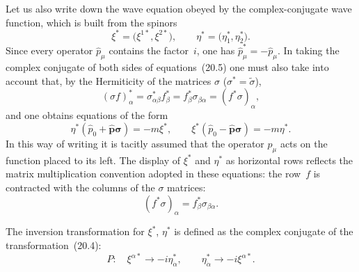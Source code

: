 Let us also write down the wave equation obeyed by the complex-conjugate wave function, which is built from the spinors
\begin{equation}
\xi^* = \bigl(\xi^{1*}, \xi^{2*}\bigr),\qquad \eta^* = \bigl(\eta^*_{\dot 1}, \eta^*_{\dot 2}\bigr).
\tag{20.10}
\end{equation}
Since every operator $\widehat p_\mu$ contains the factor~$i$, one has $\widehat p^*_\mu = -\widehat p_\mu$. In taking the complex conjugate of both sides of equations~(20.5) one must also take into account that, by the Hermiticity of the matrices $\sigma$ ($\sigma^* = \widetilde\sigma$),
\[
(\sigma f)^*_\alpha = \sigma^*_{\alpha\beta}f^*_\beta = f^*_\beta\sigma_{\beta\alpha} = (f^*\sigma)_\alpha,
\]
and one obtains equations of the form
\begin{equation}
\eta^*(\widehat p_0 + \widehat{\mathbf{p}}\boldsymbol{\sigma}) = -m\xi^*,\qquad \xi^*(\widehat p_0 - \widehat{\mathbf{p}}\boldsymbol{\sigma}) = -m\eta^*.
\tag{20.11}
\end{equation}
In this way of writing it is tacitly assumed that the operator $\widehat p_\mu$ acts on the function placed to its left. The display of $\xi^*$ and $\eta^*$ as horizontal rows reflects the matrix multiplication convention adopted in these equations: the row~$f$ is contracted with the columns of the $\sigma$ matrices:
\begin{equation}
(f^*\sigma)_\alpha = f^*_\beta\sigma_{\beta\alpha}.
\tag{20.12}
\end{equation}

The inversion transformation for $\xi^*$, $\eta^*$ is defined as the complex conjugate of the transformation~(20.4):
\begin{equation}
P:\quad \xi^{\alpha*} \to -i\eta^*_{\dot\alpha},\qquad \eta^*_{\dot\alpha} \to -i\xi^{\alpha*}.
\tag{20.13}
\end{equation}
